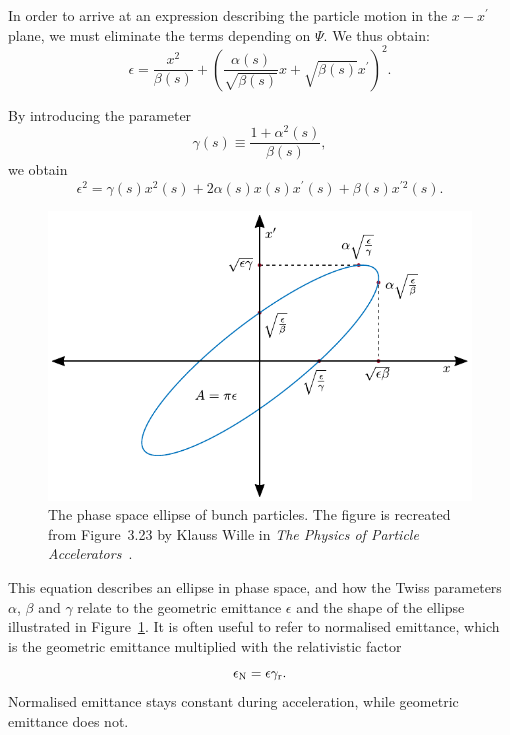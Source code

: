 In order to arrive at an expression describing the particle motion in the $x-x^\prime$ plane, we must eliminate the terms depending on $\Psi$.
We thus obtain:
\begin{equation}
    \epsilon = \frac{x^2}{\beta(s)} + \left(\frac{\alpha(s)}{\sqrt{\beta(s)}}x + \sqrt{\beta(s)}x^{\prime}\right)^2.
\end{equation}

By introducing the parameter
\begin{equation}
    \gamma(s) \equiv \frac{1+\alpha^2(s)}{\beta(s)}, \label{EQ:TwissGamma}
\end{equation}
we obtain
\begin{equation}
    \epsilon^2 = \gamma(s)x^2(s) + 2\alpha(s)x(s)x^{\prime}(s) + \beta(s)x^{\prime 2}(s). \label{EQ:EmittFull}
\end{equation}

\begin{figure}[hbt]
    \centering
    \includegraphics[width=0.8\linewidth]{figures/Twiss}
    \caption{\label{Fig:BPI:Twiss}
        The phase space ellipse of bunch particles.
        The figure is recreated from Figure~3.23 by Klauss Wille in \textit{The Physics of Particle Accelerators}~\cite{wille:2001}.
    }
\end{figure}

This equation describes an ellipse in phase space, and how the Twiss parameters $\alpha$, $\beta$ and $\gamma$ relate to the geometric emittance $\epsilon$ and the shape of the ellipse illustrated in Figure~\ref{Fig:BPI:Twiss}.
It is often useful to refer to normalised emittance, which is the geometric emittance multiplied with the relativistic factor
\begin{equation}
    \epsilon_{\mathrm{N}} = \epsilon \gamma_{\mathrm{r}}. \label{EQ:NormEmit}
\end{equation}
Normalised emittance stays constant during acceleration, while geometric emittance does not.

